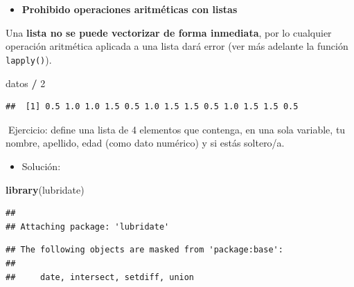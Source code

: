 \documentclass[11pt,]{book}
\newenvironment{Shaded}{\begin{snugshade}}{\end{snugshade}}
\newcommand{\DecValTok}[1]{\textcolor[rgb]{0.06,0.06,0.06}{#1}}
\newcommand{\KeywordTok}[1]{\textcolor[rgb]{0.27,0.27,0.27}{\textbf{#1}}}
\newcommand{\NormalTok}[1]{#1}
\newcommand{\OperatorTok}[1]{\textcolor[rgb]{0.43,0.43,0.43}{\textbf{#1}}}
\newcommand{\StringTok}[1]{\textcolor[rgb]{0.5,0.5,0.5}{#1}}
\providecommand{\tightlist}{%
  \setlength{\itemsep}{0pt}\setlength{\parskip}{0pt}}
\begin{document}
~

~

\begin{itemize}
\tightlist
\item
  \textbf{Prohibido operaciones aritméticas con listas}
\end{itemize}

Una \textbf{lista no se puede vectorizar de forma inmediata}, por lo cualquier operación aritmética aplicada a una lista dará error (ver más adelante la función \texttt{lapply()}).

\begin{Shaded}
\begin{Highlighting}[]
\NormalTok{datos }\OperatorTok{/}\StringTok{ }\DecValTok{2}
\end{Highlighting}
\end{Shaded}

\begin{verbatim}
##  [1] 0.5 1.0 1.0 1.5 0.5 1.0 1.5 1.5 0.5 1.0 1.5 1.5 0.5
\end{verbatim}

📝Ejercicio: define una lista de 4 elementos que contenga, en una sola variable, tu nombre, apellido, edad (como dato numérico) y si estás soltero/a.

\begin{itemize}
\tightlist
\item
  Solución:
\end{itemize}

\begin{Shaded}
\begin{Highlighting}[]
\KeywordTok{library}\NormalTok{(lubridate)}
\end{Highlighting}
\end{Shaded}

\begin{verbatim}
## 
## Attaching package: 'lubridate'
\end{verbatim}

\begin{verbatim}
## The following objects are masked from 'package:base':
## 
##     date, intersect, setdiff, union
\end{verbatim}
\end{document}
